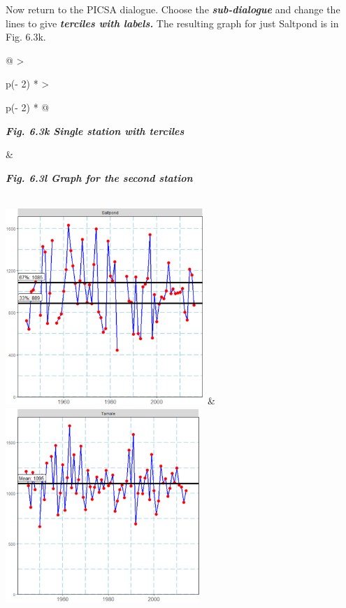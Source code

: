 \documentclass[
  letterpaper,
  DIV=11,
  numbers=noendperiod]{scrreprt}
\begin{document}
Now return to the PICSA dialogue. Choose the
\textbf{\emph{sub-dialogue}} and change the lines to give
\textbf{\emph{terciles with labels.}} The resulting graph for just
Saltpond is in Fig. 6.3k.

\begin{longtable}[]{@{}
  >{\raggedright\arraybackslash}p{(\columnwidth - 2\tabcolsep) * }
  >{\raggedright\arraybackslash}p{(\columnwidth - 2\tabcolsep) * }@{}}
\toprule\noalign{}
\begin{minipage}[b]{\linewidth}\raggedright
\textbf{\emph{Fig. 6.3k Single station with terciles}}
\end{minipage} & \begin{minipage}[b]{\linewidth}\raggedright
\textbf{\emph{Fig. 6.3l Graph for the second station}}
\end{minipage} \\
\midrule\noalign{}
\endhead
\bottomrule\noalign{}
\endlastfoot
\includegraphics[width=2.96125in,height=2.92087in]{figures/Fig6.3k.png}
&
\includegraphics[width=2.89738in,height=2.89738in]{figures/Fig6.3l.png} \\
\end{longtable}
\end{document}

